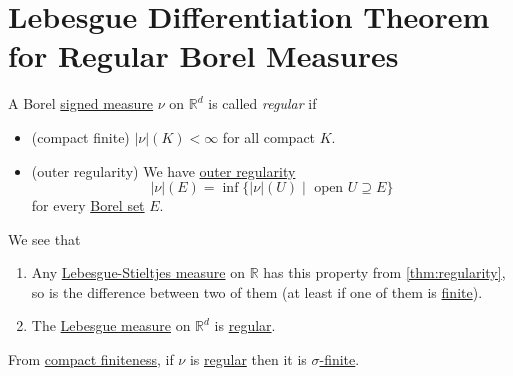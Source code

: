 \section{Lebesgue Differentiation Theorem for Regular Borel Measures}
\begin{definition}[Regular]\label{def:regular}
	A Borel \hyperref[def:signed-measure]{signed measure} \(\nu\) on \(\mathbb{R}^d\) is called \emph{regular} if
	\begin{itemize}
		\item\label{def:regular-compact-finite} (compact finite) \(\left\vert \nu \right\vert(K) < \infty\) for all compact \(K\).
		\item\label{def:regular-outer-regularity} (outer regularity) We have \hyperref[thm:regularity]{outer regularity}
		\[
			\left\vert \nu \right\vert(E) = \inf\{\left\vert \nu \right\vert(U) \mid \text{ open } U \supseteq E\}
		\]
		for every \hyperref[def:Borel-set]{Borel set} \(E\).
	\end{itemize}
\end{definition}

\begin{eg}
	We see that
	\begin{enumerate}[(1)]
		\item Any \hyperref[def:Lebesgue-Stieltjes-measure]{Lebesgue-Stieltjes measure} on \(\mathbb{R}\) has this property from \autoref{thm:regularity},
		      so is the difference between two of them (at least if one of them is \hyperref[def:finite-signed-measure]{finite}).
		\item The \hyperref[def:Lebesgue-measure]{Lebesgue measure} on \(\mathbb{R}^d\) is \hyperref[def:regular]{regular}.
	\end{enumerate}
\end{eg}

\begin{note}
	From \hyperref[def:regular-compact-finite]{compact finiteness}, if \(\nu\) is \hyperref[def:regular]{regular} then it is
	\hyperref[def:finite-signed-measure]{\(\sigma\)-finite}.
\end{note}

